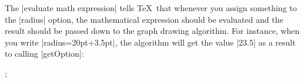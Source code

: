 The |evaluate math expression| tells \TeX\ that whenever you assign
something to the |radius| option, the mathematical expression should
be evaluated and the result should be passed down to the graph drawing
algorithm. For instance, when you write |radius=20pt+3.5pt|, the
algorithm will get the value |23.5| as a result to calling
|getOption|:

\begin{codeexample}[]
\tikz {};
\end{codeexample}


\endinput

